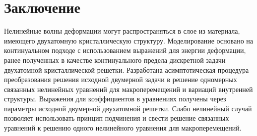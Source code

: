 \section{Заключение}

Нелинейные волны деформации могут распространяться в слое из материала, имеющего двухатомную кристаллическую структуру. Моделирование основано на континуальном подходе с использованием выражений для энергии деформации, ранее полученных в качестве континуального предела дискретной задачи двухатомной кристаллической решетки. Разработана асимптотическая процедура преобразования решения исходной двумерной задачи в решение одномерных связанных нелинейных уравнений для макроперемещений и вариаций внутренней структуры. Выражения для коэффициентов в уравнениях получены через параметры исходной двумерной двухатомной решетки. Слабо нелинейный случай позволяет использовать принцип подчинения и свести решение связанных уравнений к решению одного нелинейного уравнения для макроперемещений.

